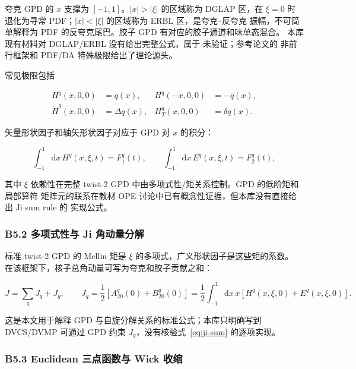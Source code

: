 \documentclass[UTF8]{ctexart}
\newcommand{\unverified}{\textcolor{warn}{未验证}}
\newcommand{\dd}{\mathrm{d}}
\begin{document}
夸克 GPD 的 $x$ 支撑为 $[-1,1]$。$|x|>|\xi|$ 的区域称为 DGLAP 区，在
$\xi=0$ 时退化为寻常 PDF；$|x|<|\xi|$ 的区域称为 ERBL 区，是夸克--反夸克
振幅，不可简单解释为 PDF 的反夸克尾巴。胶子 GPD 有对应的胶子通道和味单态混合。
本库现有材料对 DGLAP/ERBL 没有给出完整公式，属于 \unverified；参考论文的
非前行框架和 PDF/DA 特殊极限给出了理论源头。 \cite{P1}

常见极限包括

\begin{equation}
\begin{aligned}
H^q(x,0,0)&=q(x),&
H^q(-x,0,0)&=-\bar q(x),\\
\widetilde H^q(x,0,0)&=\Delta q(x),&
H_T^q(x,0,0)&=\delta q(x).
\end{aligned}
\label{eq:limits}
\end{equation}

矢量形状因子和轴矢形状因子对应于 GPD 对 $x$ 的积分：

\begin{equation}
\int_{-1}^{1}\dd x\,H^q(x,\xi,t)=F_1^q(t),\qquad
\int_{-1}^{1}\dd x\,E^q(x,\xi,t)=F_2^q(t),
\label{eq:ff-limits}
\end{equation}

其中 $\xi$ 依赖性在完整 twist-2 GPD 中由多项式性/矩关系控制。GPD 的低阶矩和局部算符
矩阵元的联系在教材 OPE 讨论中已有概念性证据，但本库没有直接给出 Ji sum rule 的
实现公式。 \cite{B1,D7}

\subsubsection{B5.2 多项式性与 Ji 角动量分解}

标准 twist-2 GPD 的 Mellin 矩是 $\xi$ 的多项式，广义形状因子是这些矩的系数。
在该框架下，核子总角动量可写为夸克和胶子贡献之和：

\begin{equation}
J=\sum_qJ_q+J_g,\qquad
J_q=\frac12\left[A^q_{20}(0)+B^q_{20}(0)\right]
=\frac12\int_{-1}^{1}\dd x\,x\left[H^q(x,\xi,0)+E^q(x,\xi,0)\right].
\label{eq:ji-sum}
\end{equation}

这是本文用于解释 GPD 与自旋分解关系的标准公式；本库只明确写到 DVCS/DVMP 可通过
GPD 约束 $J_q$，没有核验式~\eqref{eq:ji-sum} 的逐项实现。 \cite{D13}

\subsubsection{B5.3 Euclidean 三点函数与 Wick 收缩}
\end{document}
